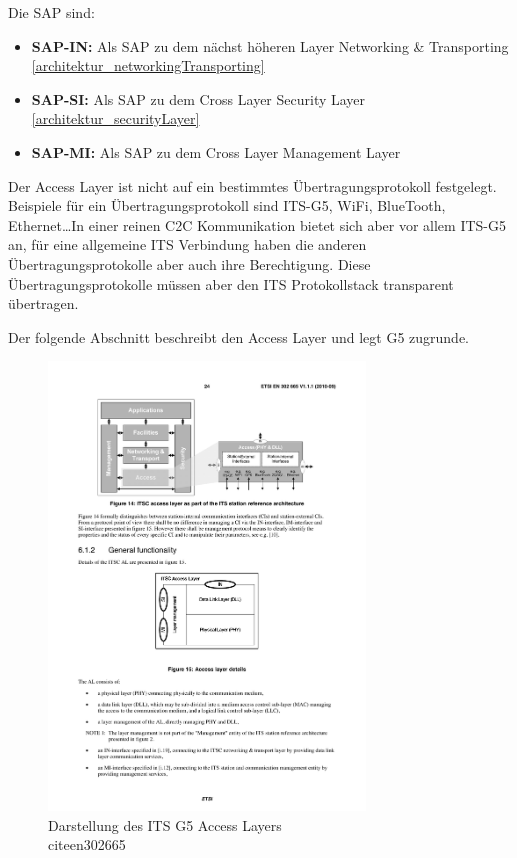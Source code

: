 Die \ac{SAP} sind:
\begin{itemize}
	\item \textbf{SAP-IN: } Als \ac{SAP} zu dem nächst höheren Layer  Networking \& Transporting \ref{architektur_networkingTransporting}
	\item \textbf{SAP-SI: } Als \ac{SAP} zu dem Cross Layer Security Layer \ref{architektur_securityLayer}
	\item \textbf{SAP-MI: } Als \ac{SAP} zu dem Cross Layer Management Layer \label{architektur_managementLayer}
\end{itemize}


Der Access Layer ist nicht auf ein bestimmtes Übertragungsprotokoll festgelegt. Beispiele für ein Übertragungsprotokoll sind ITS-G5, WiFi, BlueTooth, Ethernet\dots In einer reinen \ac{C2C} Kommunikation bietet sich aber vor allem ITS-G5 an, für eine allgemeine \ac{ITS} Verbindung haben die anderen Übertragungsprotokolle aber auch ihre Berechtigung. Diese Übertragungsprotokolle müssen aber den \ac{ITS} Protokollstack transparent übertragen. 

Der folgende Abschnitt beschreibt den Access Layer und legt G5 zugrunde.
 
\begin{figure}
	\includegraphics[width=0.75\textwidth]{content/images/02_architektur/accessLayer.pdf}
	\caption{Darstellung des ITS G5 Access Layers \\cite{en302665}}
	\label{fig:architektur_accessLayer}
\end{figure}

